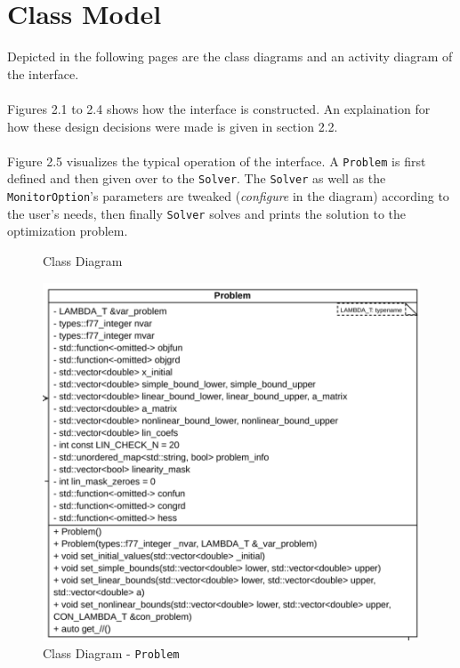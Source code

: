 \documentclass{book}
\begin{document}
\section{Class Model}
Depicted in the following pages are the class diagrams and an activity diagram of the interface. \\\\
Figures 2.1 to 2.4 shows how the interface is constructed. An explaination for how these design decisions were made is given in section 2.2. \\\\
Figure 2.5 visualizes the typical operation of the interface. A \texttt{Problem} is first defined and then given over to the \texttt{Solver}. The \texttt{Solver} as well as the \texttt{MonitorOption}'s parameters are tweaked (\textit{configure} in the diagram) according to the user's needs, then finally \texttt{Solver} solves and prints the solution to the optimization problem.
\begin{figure}[!hp]\centering
{}
\caption{Class Diagram}
\end{figure}
\begin{figure}[!htbp]\centering
\includegraphics[width=\textwidth]{class problem.png}
\caption{Class Diagram - \tt Problem}%
\end{figure}
\end{document}
